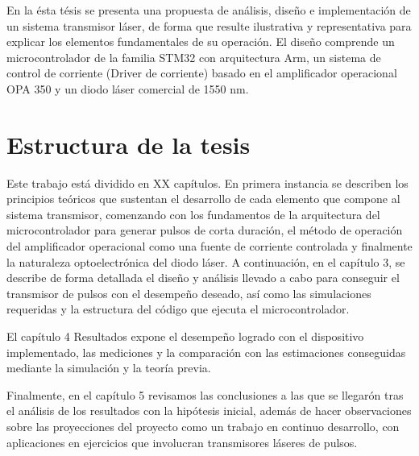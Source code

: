 En la ésta tésis se presenta una propuesta de análisis, diseño e implementación de un sistema transmisor láser, de forma que resulte ilustrativa y representativa para explicar los elementos fundamentales de su operación. El diseño comprende un microcontrolador de la familia STM32 con arquitectura Arm, un sistema de control de corriente (Driver de corriente) basado en el amplificador operacional OPA 350 y un diodo láser comercial de 1550 nm.


\section{Estructura de la tesis}

Este trabajo está dividido en XX capítulos. En primera instancia se describen los principios teóricos que sustentan el desarrollo de cada elemento que compone al sistema transmisor, comenzando con los fundamentos de la arquitectura del microcontrolador para generar pulsos de corta duración, el método de operación del amplificador operacional como una fuente de corriente controlada y finalmente la naturaleza optoelectrónica del diodo láser. 
A continuación, en el capítulo 3, se describe de forma detallada el diseño y análisis llevado a cabo para conseguir el transmisor de pulsos con el desempeño deseado, así como las simulaciones requeridas y la estructura del código que ejecuta el microcontrolador. 

El capítulo 4 Resultados expone el desempeño logrado con el dispositivo implementado, las mediciones y la comparación con las estimaciones conseguidas mediante la simulación y la teoría previa. 

Finalmente, en el capítulo 5 revisamos las conclusiones a las que se llegarón tras el análisis de los resultados con la hipótesis inicial, además de hacer observaciones sobre las proyecciones del proyecto como un trabajo en continuo desarrollo, con aplicaciones en ejercicios que involucran transmisores láseres de pulsos.
